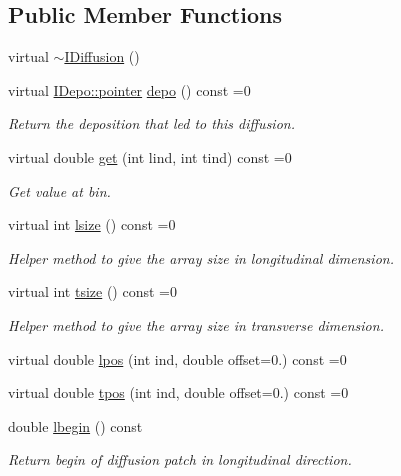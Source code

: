 \subsection*{Public Member Functions}
\begin{DoxyCompactItemize}
\item 
virtual \hyperlink{class_wire_cell_1_1_i_diffusion_a3a3fe50025a9f034cb5552a054c4c7b7}{$\sim$\+I\+Diffusion} ()
\item 
virtual \hyperlink{class_wire_cell_1_1_i_data_aff870b3ae8333cf9265941eef62498bc}{I\+Depo\+::pointer} \hyperlink{class_wire_cell_1_1_i_diffusion_a657118deda45efadd86ec286ee9242a7}{depo} () const =0
\begin{DoxyCompactList}\small\item\em Return the deposition that led to this diffusion. \end{DoxyCompactList}\item 
virtual double \hyperlink{class_wire_cell_1_1_i_diffusion_ae37342e7b048d186c14fe86e81d706c5}{get} (int lind, int tind) const =0
\begin{DoxyCompactList}\small\item\em Get value at bin. \end{DoxyCompactList}\item 
virtual int \hyperlink{class_wire_cell_1_1_i_diffusion_a877d15af9f833bc95a7943a0251289af}{lsize} () const =0
\begin{DoxyCompactList}\small\item\em Helper method to give the array size in longitudinal dimension. \end{DoxyCompactList}\item 
virtual int \hyperlink{class_wire_cell_1_1_i_diffusion_affce6824ad0e746270f0b6b27177584e}{tsize} () const =0
\begin{DoxyCompactList}\small\item\em Helper method to give the array size in transverse dimension. \end{DoxyCompactList}\item 
virtual double \hyperlink{class_wire_cell_1_1_i_diffusion_a6e85228ca6d4b6848bb8f80a1018a2aa}{lpos} (int ind, double offset=0.) const =0
\item 
virtual double \hyperlink{class_wire_cell_1_1_i_diffusion_a0f9fd1a277828333fa08f77fd9a6315d}{tpos} (int ind, double offset=0.) const =0
\item 
double \hyperlink{class_wire_cell_1_1_i_diffusion_a554ef0f091287ae6e9f707a961f5a53c}{lbegin} () const
\begin{DoxyCompactList}\small\item\em Return begin of diffusion patch in longitudinal direction. \end{DoxyCompactList}\item 

\end{DoxyCompactItemize}
